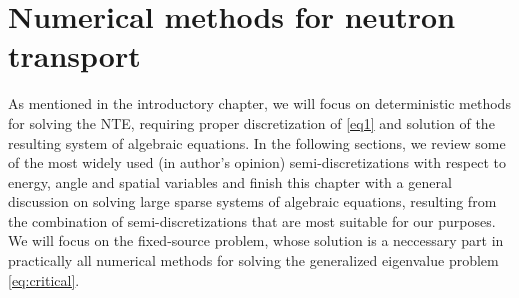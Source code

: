 \ifpdf
	\graphicspath{{3/pic/PNG/}{3/pic/PDF/}{3/pic/}}
\else
	\graphicspath{{3/pic/EPS/}{3/pic/}}
\fi

\chapter{Numerical methods for neutron transport}\label{chap:nte-methods}

As mentioned in the introductory chapter, we will focus on deterministic methods for solving the NTE, requiring proper
discretization of \eqref{eq1} and solution of the resulting system of algebraic equations. 
In the following sections, we review some of the most widely used (in author's opinion) semi-discretizations with respect to
energy, angle and spatial variables and finish this chapter with a general discussion on solving large sparse systems of
algebraic equations, resulting from the combination of semi-discretizations that are most suitable for our purposes. We
will focus on the fixed-source problem, whose solution is a neccessary part in practically all numerical methods for
solving the generalized eigenvalue problem \eqref{eq:critical}.

